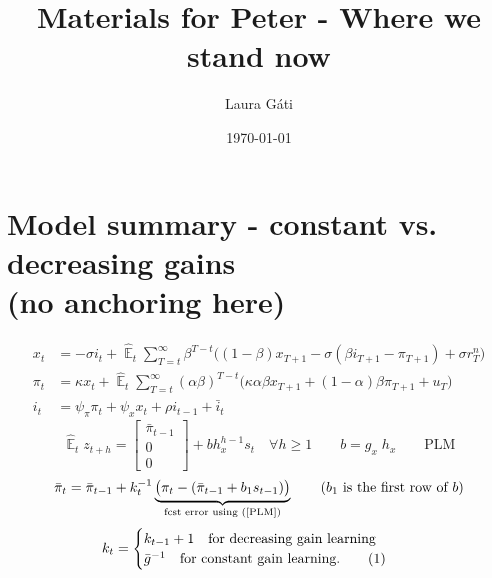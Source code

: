 \documentclass[11pt]{article}
\renewcommand{\[}{\begin{equation}}
\renewcommand{\]}{\end{equation}}
\DeclareMathOperator{\E}{\mathbb{E}}
\newcommand\numberthis{\addtocounter{equation}{1}\tag{\theequation}} %
\begin{document}
\linespread{1.0}

\title{Materials for Peter - Where we stand now}
\author{Laura G\'ati} 
\date{\today}
\maketitle


\tableofcontents



\section{Model summary - constant vs. decreasing gains \\ (no anchoring here)}
\begin{align}
x_t &=  -\sigma i_t +\hat{\E}_t \sum_{T=t}^{\infty} \beta^{T-t }\big( (1-\beta)x_{T+1} - \sigma(\beta i_{T+1} - \pi_{T+1}) +\sigma r_T^n \big)  \label{prestons18}  \\
\pi_t &= \kappa x_t +\hat{\E}_t \sum_{T=t}^{\infty} (\alpha\beta)^{T-t }\big( \kappa \alpha \beta x_{T+1} + (1-\alpha)\beta \pi_{T+1} + u_T\big) \label{prestons19}  \\
i_t &= \psi_{\pi}\pi_t + \psi_{x} x_t  + \rho i_{t-1} + \bar{i}_t \label{TR}
\end{align}
\begin{equation}
\hat{\E}_t z_{t+h} =  \begin{bmatrix}\bar{\pi}_{t-1} \\ 0 \\ 0 \end{bmatrix}+ bh_x^{h-1}s_t  \quad \forall h\geq 1 \quad \quad b = g_x \; h_x \quad \quad \text{PLM} \label{PLM}
\end{equation}
\begin{equation}
\bar{\pi}_{t} = \bar{\pi}_{t-1} +k_t^{-1}\underbrace{\big(\pi_{t} -(\bar{\pi}_{t-1}+b_1s_{t-1}) \big)}_{\text{fcst error using (\ref{PLM})} } \quad \quad  \text{($b_1$ is the first row of $b$)}
\end{equation}
 \begin{align*}
k_t & = \begin{cases} k_{t-1}+1 \quad \text{for decreasing gain learning}  \\ \bar{g}^{-1}  \quad \text{for constant gain learning.}\numberthis
\end{cases} 
\end{align*}
\end{document}
